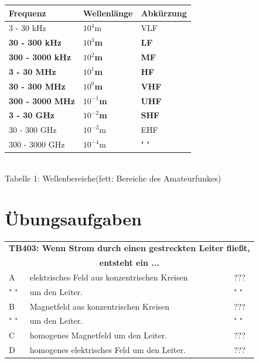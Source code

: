 \begin{frame}
	\begin{center}
	\begin{Large}
	\begin{tabular}{|l|l|l|}
		\hline
		Frequenz & Wellenl\"ange & Abk\"urzung\\
		\hline \hline
		3 - 30 kHz     & $10^{4}$m    & VLF \\ \hline 
		\textbf{30 - 300 kHz}   & \textbf{$10^{3}$m}      & \textbf{LF}  \\ \hline 
		\textbf{300 - 3000 kHz} & \textbf{$10^{2}$m}     & \textbf{MF}  \\ \hline
		\textbf{3 - 30 MHz}     & \textbf{$10^{1}$m}      & \textbf{HF}  \\ \hline
		\textbf{30 - 300 MHz}   & \textbf{$10^{0}$m}          & \textbf{VHF} \\ \hline
		\textbf{300 - 3000 MHz} & \textbf{$10^{-1}$m}      & \textbf{UHF} \\ \hline
		\textbf{3 - 30 GHz}     & \textbf{$10^{-2}$m}     & \textbf{SHF} \\ \hline
		30 - 300 GHz   & $10^{-3}$m     & EHF \\ \hline
		300 - 3000 GHz & $10^{-4}$m & " " \\ \hline
	\end{tabular}\\
	Tabelle 1: Wellenbereiche(fett: Bereiche des Amateurfunkes)
	\end{Large}		
	\end{center}
\end{frame}

\section*{\"Ubungsaufgaben}
\begin{frame}
	\begin{center}
	\begin{small}
	\begin{tabular}{|l|l|l|}
		\hline
		\multicolumn{3}{|c|}{\textbf{TB403: Wenn Strom durch einen gestreckten Leiter fließt,}}\\
		\multicolumn{3}{|c|}{\textbf{entsteht ein ...}}\\
		\hline
		A & elektrisches Feld aus konzentrischen Kreisen & ??? \\ 
		" " & um den Leiter. & " " \\ \hline
		B & Magnetfeld aus konzentrischen Kreisen        & ??? \\ 
		" " & um den Leiter. & " " \\ \hline
		C & homogenes Magnetfeld um den Leiter.          & ??? \\ \hline
		D & homogenes elektrisches Feld um den Leiter.   & ??? \\ \hline
	\end{tabular}
	\end{small}		
	\end{center}
\end{frame}

